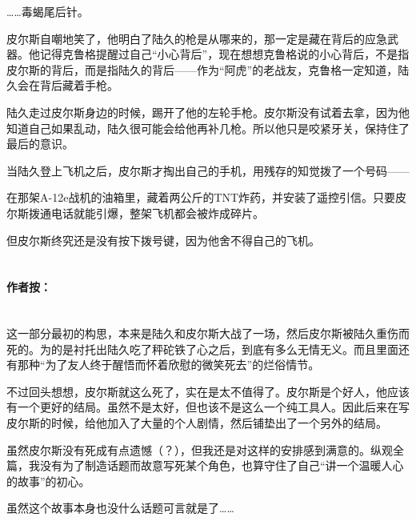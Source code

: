 ……毒蝎尾后针。

皮尔斯自嘲地笑了，他明白了陆久的枪是从哪来的，那一定是藏在背后的应急武器。他记得克鲁格提醒过自己“小心背后”，现在想想克鲁格说的小心背后，不是指皮尔斯的背后，而是指陆久的背后——作为“阿虎”的老战友，克鲁格一定知道，陆久会在背后藏着手枪。

陆久走过皮尔斯身边的时候，踢开了他的左轮手枪。皮尔斯没有试着去拿，因为他知道自己如果乱动，陆久很可能会给他再补几枪。所以他只是咬紧牙关，保持住了最后的意识。

当陆久登上飞机之后，皮尔斯才掏出自己的手机，用残存的知觉拨了一个号码——

在那架A-12e战机的油箱里，藏着两公斤的TNT炸药，并安装了遥控引信。只要皮尔斯拨通电话就能引爆，整架飞机都会被炸成碎片。

但皮尔斯终究还是没有按下拨号键，因为他舍不得自己的飞机。

\section*{}
\paragraph*{作者按：}\mbox{}\\

这一部分最初的构思，本来是陆久和皮尔斯大战了一场，然后皮尔斯被陆久重伤而死的。为的是衬托出陆久吃了秤砣铁了心之后，到底有多么无情无义。而且里面还有那种“为了友人终于醒悟而怀着欣慰的微笑死去”的烂俗情节。

不过回头想想，皮尔斯就这么死了，实在是太不值得了。皮尔斯是个好人，他应该有一个更好的结局。虽然不是太好，但也该不是这么一个纯工具人。因此后来在写皮尔斯的时候，给他加入了大量的个人剧情，然后铺垫出了一个另外的结局。

虽然皮尔斯没有死成有点遗憾（？），但我还是对这样的安排感到满意的。纵观全篇，我没有为了制造话题而故意写死某个角色，也算守住了自己“讲一个温暖人心的故事”的初心。

虽然这个故事本身也没什么话题可言就是了……